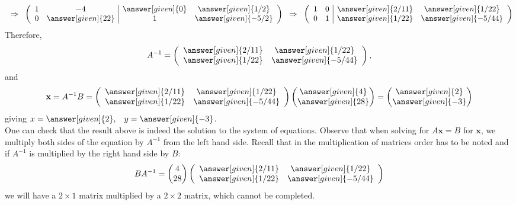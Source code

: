 \documentclass{ximera}
\begin{document}
\begin{example}
\begin{prompt}
\[\]
\[\hspace{.2cm}\Rightarrow \hspace{.2cm}
\left(\begin{array}{cc|cc}
  1 &  -4 & \answer[given]{0} & \answer[given]{1/2}  \\
  0 &  \answer[given]{22} & 1 & \answer[given]{-5/2}  \\
\end{array}\right)
\hspace{.2cm}\Rightarrow \hspace{.2cm}
\left(\begin{array}{cc|cc}
  1 &  0 & \answer[given]{2/11} & \answer[given]{1/22}  \\
  0 &  1 & \answer[given]{1/22} & \answer[given]{-5/44}  \\
\end{array}\right)
\]
Therefore,
\[
A^{-1}= \left(\begin{array}{cc}
 \answer[given]{2/11} & \answer[given]{1/22}  \\
  \answer[given]{1/22} & \answer[given]{-5/44}  \\
\end{array}\right),
\]
and
\[
\textbf{x} = A^{-1}B = \left(\begin{array}{cc}
 \answer[given]{2/11} & \answer[given]{1/22}  \\
  \answer[given]{1/22} & \answer[given]{-5/44}  \\
\end{array}\right) \begin{pmatrix}
\answer[given]{4}\\
\answer[given]{28}
\end{pmatrix} = \begin{pmatrix}
\answer[given]{2}\\
\answer[given]{-3}
\end{pmatrix}
\]
giving $x= \answer[given]{2}, \hspace{.3cm} y= \answer[given]{-3}$. \\

One can check that the result above is indeed the solution to the system of equations. Observe that when solving for $A\textbf{x}=B$ for $\textbf{x}$, we multiply both sides of the equation by $A^{-1}$ from the left hand side. Recall that in the multiplication of matrices order has to be noted and if $A^{-1}$ is multiplied by the right hand side by $B$:
\[
BA^{-1} = \begin{pmatrix} 4\\
28
\end{pmatrix} \left(\begin{array}{cc}
 \answer[given]{2/11} & \answer[given]{1/22}  \\
  \answer[given]{1/22} & \answer[given]{-5/44}  \\
\end{array}\right) \]
we will have a $2 \times 1$ matrix multiplied by a $2\times 2$ matrix, which cannot be completed.
\end{prompt}
\end{example}
\end{document}
